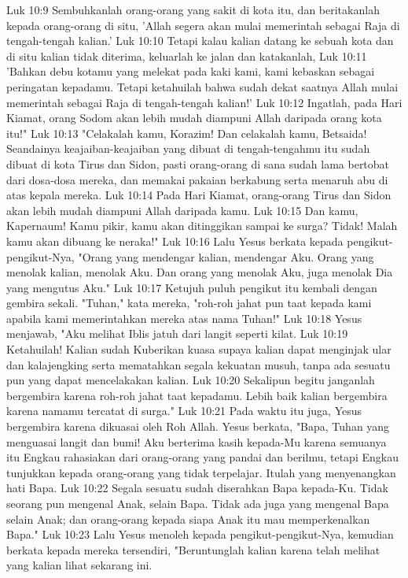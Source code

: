 Luk 10:9  Sembuhkanlah orang-orang yang sakit di kota itu, dan beritakanlah kepada orang-orang di situ, 'Allah segera akan mulai memerintah sebagai Raja di tengah-tengah kalian.'
Luk 10:10  Tetapi kalau kalian datang ke sebuah kota dan di situ kalian tidak diterima, keluarlah ke jalan dan katakanlah,
Luk 10:11  'Bahkan debu kotamu yang melekat pada kaki kami, kami kebaskan sebagai peringatan kepadamu. Tetapi ketahuilah bahwa sudah dekat saatnya Allah mulai memerintah sebagai Raja di tengah-tengah kalian!'
Luk 10:12  Ingatlah, pada Hari Kiamat, orang Sodom akan lebih mudah diampuni Allah daripada orang kota itu!"
Luk 10:13  "Celakalah kamu, Korazim! Dan celakalah kamu, Betsaida! Seandainya keajaiban-keajaiban yang dibuat di tengah-tengahmu itu sudah dibuat di kota Tirus dan Sidon, pasti orang-orang di sana sudah lama bertobat dari dosa-dosa mereka, dan memakai pakaian berkabung serta menaruh abu di atas kepala mereka.
Luk 10:14  Pada Hari Kiamat, orang-orang Tirus dan Sidon akan lebih mudah diampuni Allah daripada kamu.
Luk 10:15  Dan kamu, Kapernaum! Kamu pikir, kamu akan ditinggikan sampai ke surga? Tidak! Malah kamu akan dibuang ke neraka!"
Luk 10:16  Lalu Yesus berkata kepada pengikut-pengikut-Nya, "Orang yang mendengar kalian, mendengar Aku. Orang yang menolak kalian, menolak Aku. Dan orang yang menolak Aku, juga menolak Dia yang mengutus Aku."
Luk 10:17  Ketujuh puluh pengikut itu kembali dengan gembira sekali. "Tuhan," kata mereka, "roh-roh jahat pun taat kepada kami apabila kami memerintahkan mereka atas nama Tuhan!"
Luk 10:18  Yesus menjawab, "Aku melihat Iblis jatuh dari langit seperti kilat.
Luk 10:19  Ketahuilah! Kalian sudah Kuberikan kuasa supaya kalian dapat menginjak ular dan kalajengking serta mematahkan segala kekuatan musuh, tanpa ada sesuatu pun yang dapat mencelakakan kalian.
Luk 10:20  Sekalipun begitu janganlah bergembira karena roh-roh jahat taat kepadamu. Lebih baik kalian bergembira karena namamu tercatat di surga."
Luk 10:21  Pada waktu itu juga, Yesus bergembira karena dikuasai oleh Roh Allah. Yesus berkata, "Bapa, Tuhan yang menguasai langit dan bumi! Aku berterima kasih kepada-Mu karena semuanya itu Engkau rahasiakan dari orang-orang yang pandai dan berilmu, tetapi Engkau tunjukkan kepada orang-orang yang tidak terpelajar. Itulah yang menyenangkan hati Bapa.
Luk 10:22  Segala sesuatu sudah diserahkan Bapa kepada-Ku. Tidak seorang pun mengenal Anak, selain Bapa. Tidak ada juga yang mengenal Bapa selain Anak; dan orang-orang kepada siapa Anak itu mau memperkenalkan Bapa."
Luk 10:23  Lalu Yesus menoleh kepada pengikut-pengikut-Nya, kemudian berkata kepada mereka tersendiri, "Beruntunglah kalian karena telah melihat yang kalian lihat sekarang ini.
